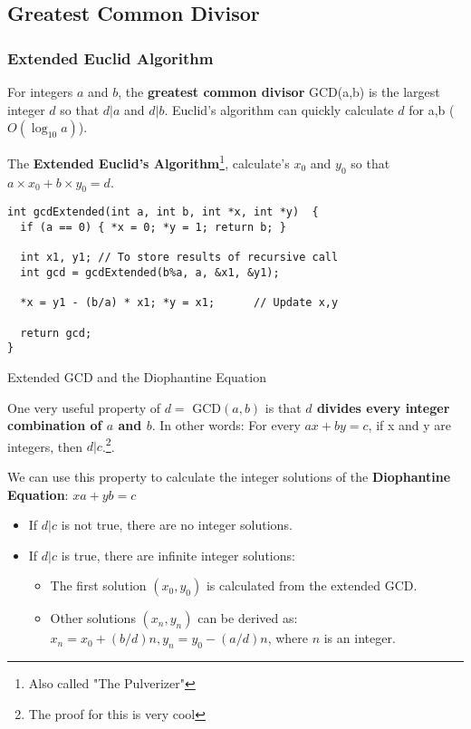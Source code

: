 \subsection{Greatest Common Divisor}
\begin{frame}[fragile]
  \frametitle{Extended Euclid Algorithm}

  For integers $a$ and $b$, the {\bf greatest common divisor} GCD(a,b) is the largest integer $d$ so that $d|a$ and $d|b$. Euclid's algorithm can quickly calculate $d$ for a,b ($O(\log_{10}a)$).\bigskip

  The {\bf Extended Euclid's Algorithm}\footnote{Also called "The Pulverizer"}, calculate's $x_0$ and $y_0$ so that $a\times x_0 + b\times y_0 = d$.

{\smaller
    \begin{exampleblock}{}
\begin{verbatim}
int gcdExtended(int a, int b, int *x, int *y)  {
  if (a == 0) { *x = 0; *y = 1; return b; }

  int x1, y1; // To store results of recursive call
  int gcd = gcdExtended(b%a, a, &x1, &y1);

  *x = y1 - (b/a) * x1; *y = x1;      // Update x,y

  return gcd;
}
\end{verbatim}
    \end{exampleblock}
}
\end{frame}

\begin{frame}{Extended GCD and the Diophantine Equation}

  One very useful property of $d =$ GCD$(a,b)$ is that {\bf $d$ divides every integer combination of $a$ and $b$}. In other words: For every $ax+by = c$, if x and y are integers, then $d|c$.\footnote{The proof for this is very cool}.\bigskip

  We can use this property to calculate the integer solutions of the {\bf Diophantine Equation}: $xa+yb = c$\bigskip

  \begin{itemize}
    \item If $d|c$ is not true, there are no integer solutions.
    \item If $d|c$ is true, there are infinite integer solutions:
    \begin{itemize}
      \item The first solution $(x_0, y_0)$ is calculated from the extended GCD.
      \item Other solutions $(x_n,y_n)$ can be derived as: $x_n = x_0 + (b/d)n, y_n = y_0 - (a/d)n$, where $n$ is an integer.
    \end{itemize}
  \end{itemize}


\end{frame}


